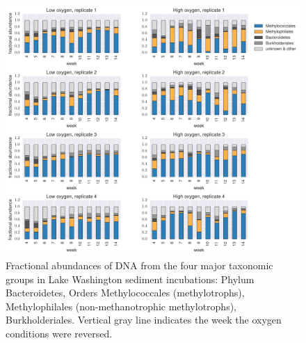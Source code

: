\begin{figure}[H]
\centering
    \includegraphics[width=1.0\textwidth]{./tex/chapter2/figures/170413_4_main_groups.pdf}  %
    \begin{singlespace}
    \caption[Four major taxonomic groups in Lake Washington sediment incubations]{
        Fractional abundances of DNA from the four major taxonomic groups in Lake Washington sediment incubations:
	    Phylum Bacteroidetes, Orders Methylococcales (methylotrophs), Methylophilales (non-methanotrophic methylotrophs), Burkholderiales.
        Vertical gray line indicates the week the oxygen conditions were reversed.
        }
    \label{fig:4dominant_groups}
    \end{singlespace}
\end{figure}

